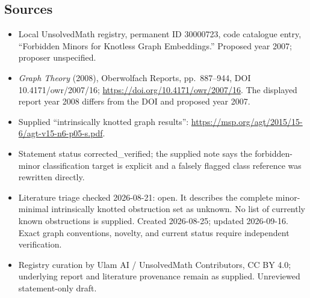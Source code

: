 \documentclass[11pt]{article}
\begin{document}
\subsection{Sources}
\begin{itemize}
\item Local UnsolvedMath registry, permanent ID 30000723, code catalogue entry, ``Forbidden Minors for Knotless Graph Embeddings.'' Proposed year 2007; proposer unspecified.
\item \emph{Graph Theory} (2008), Oberwolfach Reports, pp.\ 887--944, DOI 10.4171/owr/2007/16; \url{https://doi.org/10.4171/owr/2007/16}. The displayed report year 2008 differs from the DOI and proposed year 2007.
\item Supplied ``intrinsically knotted graph results'': \url{https://msp.org/agt/2015/15-6/agt-v15-n6-p05-s.pdf}.
\item Statement status corrected\_verified; the supplied note says the forbidden-minor classification target is explicit and a falsely flagged class reference was rewritten directly.
\item Literature triage checked 2026-08-21: open. It describes the complete minor-minimal intrinsically knotted obstruction set as unknown. No list of currently known obstructions is supplied. Created 2026-08-25; updated 2026-09-16. Exact graph conventions, novelty, and current status require independent verification.
\item Registry curation by Ulam AI / UnsolvedMath Contributors, CC BY 4.0; underlying report and literature provenance remain as supplied. Unreviewed statement-only draft.
\end{itemize}
\end{document}
